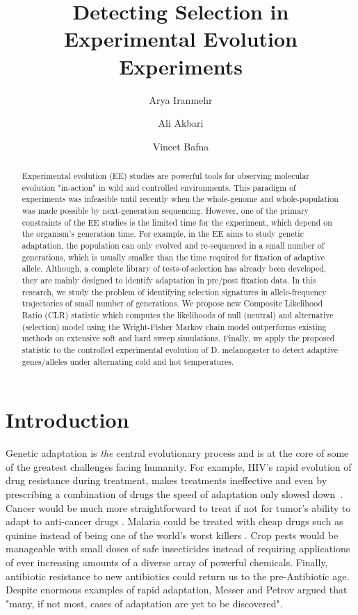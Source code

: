 \documentclass[11pt]{article}
\title{Detecting Selection in Experimental Evolution Experiments}
\author[1]{Arya Iranmehr}
\author[1]{Ali Akbari}
\author[2]{Vineet Bafna}
\affil[1]{\footnotesize Electrical and Computer Engineering, University of California, San Diego, La Jolla, CA 92093, USA.}
\affil[2]{\footnotesize Computer Science \& Engineering, University of California, San Diego, La Jolla, CA 92093, USA}
\date{}
\begin{document}
\maketitle
\begin{abstract}
Experimental evolution (EE) studies are powerful tools for observing
molecular evolution "in-action" in wild and controlled environments. This 
paradigm of experiments was infeasible until recently when the whole-genome 
and whole-population was made possible by next-generation sequencing. 
However, one of the primary constraints of the EE studies 
is the 
limited time for the experiment, which depend on the organism's generation 
time. 
For example, in the EE aims to study genetic adaptation, the population 
can only evolved and re-sequenced in a small number of generations, which is 
usually smaller than the time required for fixation of adaptive 
allele. Although, a 
complete library of tests-of-selection has already been developed, they are 
mainly designed 
to identify adaptation in pre/post fixation data.
In this research, we study the problem of identifying selection signatures in 
allele-frequency trajectories of small number of generations. 
We propose new Composite Likelihood Ratio 
(CLR) statistic which computes the likelihoods of null (neutral) and 
alternative (selection) model using the Wright-Fisher Markov chain model 
outperforms existing methods on extensive soft and hard sweep simulations. 
Finally, we apply the proposed statistic to the controlled experimental 
evolution of D. melanogaster to detect adaptive genes/alleles under alternating 
cold and hot temperatures.
\end{abstract}
\section{Introduction}
Genetic adaptation is \emph{the} central evolutionary process and is at the
 core of some of the greatest challenges facing humanity. 
For example, HIV's rapid evolution of drug resistance during treatment, makes 
treatments ineffective and even by prescribing a combination of drugs the speed 
of adaptation only slowed down~\cite{Feder2016More}. 
Cancer would be much more straightforward to treat if not for
tumor's ability to adapt to anti-cancer drugs 
\cite{gottesman2002mechanisms,zahreddine2013mechanisms}. 
Malaria could be treated with cheap drugs such as quinine instead of 
being one of the world's worst killers 
\cite{ariey2014molecular,nair2007recurrent}. 
Crop pests would be manageable with small doses of safe insecticides 
instead of requiring applications of ever increasing amounts of a diverse array 
of powerful chemicals\cite{daborn2001ddt}. 
Finally, antibiotic resistance \cite{spellberg2008epidemic} to new antibiotics 
could return us to the pre-Antibiotic age.
Despite enormous examples of rapid adaptation, Messer and Petrov 
\cite{messer2013population} argued that "many, if not most, cases of adaptation 
are yet to be discovered".
\end{document}
